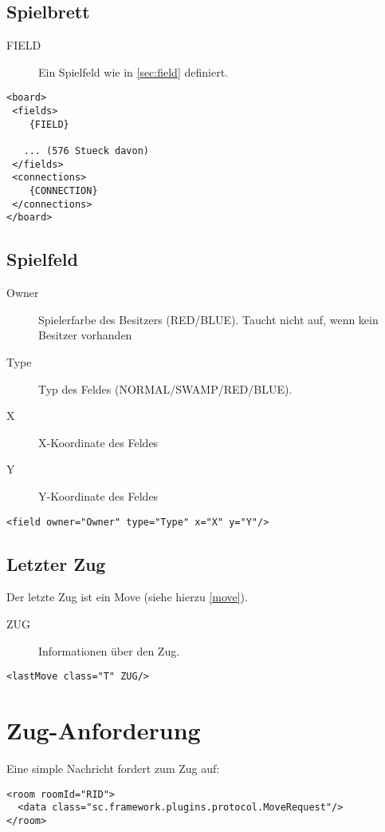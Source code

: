 \documentclass[12pt,a4paper, ngerman, oneside]{scrartcl}
\begin{document}
\subsection{\label{board}Spielbrett}
\begin{description}
\item[FIELD] Ein Spielfeld wie in \ref{sec:field} definiert.
\end{description}
\begin{verbatim}
<board>
 <fields>
 	{FIELD}
  
   ... (576 Stueck davon)
 </fields>
 <connections>
 	{CONNECTION}
 </connections>
</board>
\end{verbatim}

\subsection{\label{sec:field}Spielfeld}
\begin{description}
\item[Owner] Spielerfarbe des Besitzers (RED/BLUE). Taucht nicht auf, wenn kein
Besitzer vorhanden
\item[Type] Typ des Feldes (NORMAL/SWAMP/RED/BLUE).
\item[X] X-Koordinate des Feldes
\item[Y] Y-Koordinate des Feldes
\end{description}
\begin{verbatim}
<field owner="Owner" type="Type" x="X" y="Y"/>
\end{verbatim}

\subsection{\label{lastmove}Letzter Zug}
Der letzte Zug ist ein Move (siehe hierzu \ref{move}).
\begin{description}
\item[ZUG] Informationen \"uber den Zug.
\end{description}
\begin{verbatim}
<lastMove class="T" ZUG/>
\end{verbatim}

\section{\label{moverequest}Zug-Anforderung}
Eine simple Nachricht fordert zum Zug auf:
\begin{verbatim}
<room roomId="RID">
  <data class="sc.framework.plugins.protocol.MoveRequest"/>
</room>
\end{verbatim}
\end{document}
